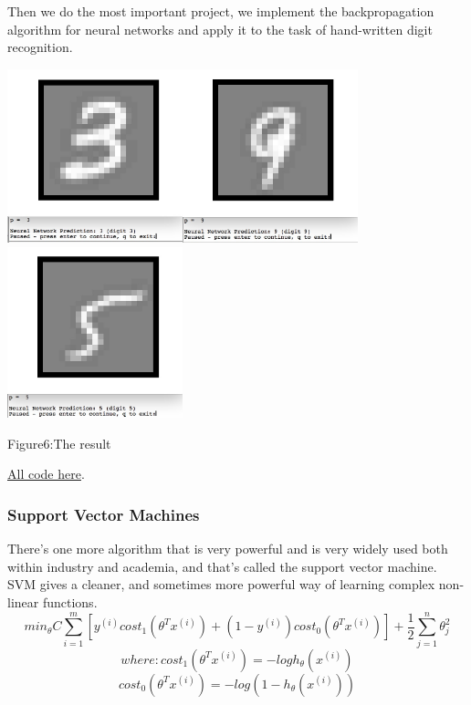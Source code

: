 \documentclass[a4paper]{article}
\begin{document}
{Then we do the most important project, we implement the backpropagation algorithm for neural networks and apply it to the task of hand-written digit recognition.

\includegraphics[width=2in]{3.png}\includegraphics[width=2in]{9.png}\includegraphics[width=2in]{5.png}
\begin{center}
Figure6:The result
\end{center}
\href{https://github.com/GuangYueCHEN/ENSIIE/tree/master/Plus/MachineLearning/machine-learning-ex3}{All code here}.\\
\subsubsection{\textbf{Support Vector Machines}}
  There's one more algorithm that is very powerful and is very widely used both within industry and academia, and that's called the support vector machine. SVM gives a cleaner, and sometimes more powerful way of learning complex non-linear functions.
 $$min_\theta C\sum_{i=1}^m[y^{(i)}cost_1(\theta^Tx^{(i)})+(1-y^{(i)})cost_0(\theta^Tx^{(i)})]+\frac{1}{2}\sum_{j=1}^n\theta^2_j$$$$where:cost_1(\theta^Tx^{(i)})=-logh_\theta(x^{(i)})$$$$cost_0(\theta^Tx^{(i)})=-log(1-h_\theta(x^{(i)}))$$
 
}
\end{document}
